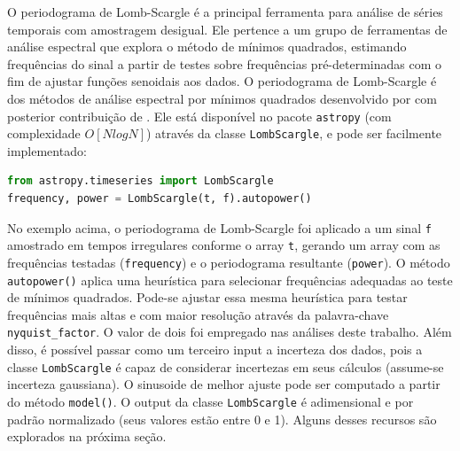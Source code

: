 O periodograma de Lomb-Scargle é a principal ferramenta para análise de séries temporais com amostragem desigual. Ele pertence a um grupo de ferramentas de análise espectral que explora o método de mínimos quadrados, estimando frequências do sinal a partir de testes sobre frequências pré-determinadas com o fim de ajustar funções senoidais aos dados. O periodograma de Lomb-Scargle é dos métodos de análise espectral por mínimos quadrados desenvolvido por  com posterior contribuição de . Ele está disponível no pacote \texttt{astropy} (com complexidade $O[NlogN]$) através da classe \texttt{LombScargle}, e pode ser facilmente implementado:

\vspace{-2mm}
\begin{lstlisting}[language=python,style=mystyle2]
from astropy.timeseries import LombScargle
frequency, power = LombScargle(t, f).autopower()
\end{lstlisting}

No exemplo acima, o periodograma de Lomb-Scargle foi aplicado a um sinal \texttt{f} amostrado em tempos irregulares conforme o array \texttt{t}, gerando um array com as frequências testadas (\texttt{frequency}) e o periodograma resultante (\texttt{power}). O método \texttt{autopower()} aplica uma heurística para selecionar frequências adequadas ao teste de mínimos quadrados. Pode-se ajustar essa mesma heurística para testar frequências mais altas e com maior resolução através da palavra-chave \texttt{nyquist\_factor}. O valor de dois foi empregado nas análises deste trabalho. Além disso, é possível passar como um terceiro input a incerteza dos dados, pois a classe \texttt{LombScargle} é capaz de considerar incertezas em seus cálculos (assume-se incerteza gaussiana). O sinusoide de melhor ajuste pode ser computado a partir do método \texttt{model()}. O output da classe \texttt{LombScargle} é adimensional e por padrão normalizado (seus valores estão entre 0 e 1). Alguns desses recursos são explorados na próxima seção.



